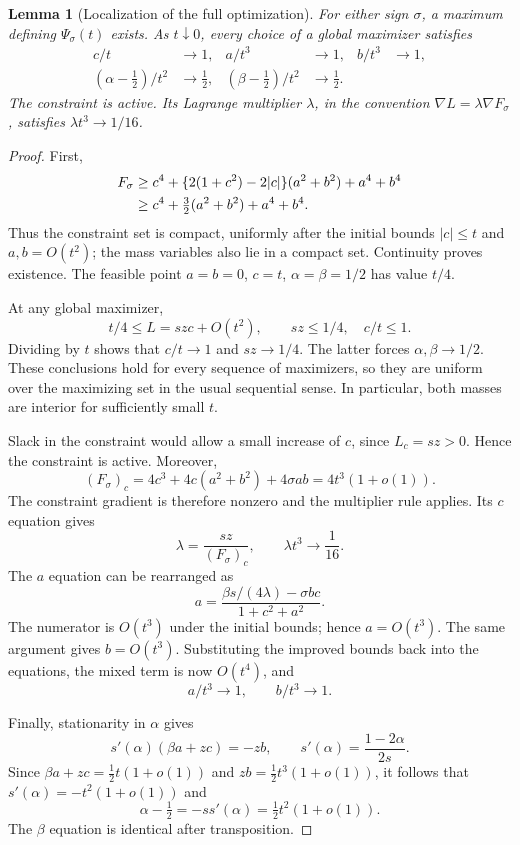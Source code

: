 \documentclass[11pt]{article}
\newtheorem{lemma}[theorem]{Lemma}
\theoremstyle{definition}
\newcommand{\1}{\mathbf 1}
\begin{document}
\begin{lemma}[Localization of the full optimization]\label{lem:localize}
For either sign $\sigma$, a maximum defining $\Psi_\sigma(t)$ exists. As $t\downarrow0$, every choice of a global maximizer satisfies
\begin{align}
 c/t&\longrightarrow1,& a/t^3&\longrightarrow1,& b/t^3&\longrightarrow1,\label{eq:loc1}\\
 (\alpha-\tfrac12)/t^2&\longrightarrow\tfrac12,&
 (\beta-\tfrac12)/t^2&\longrightarrow\tfrac12.\label{eq:loc2}
\end{align}
The constraint is active. Its Lagrange multiplier $\lambda$, in the convention $\nabla L=\lambda\nabla F_\sigma$, satisfies $\lambda t^3\to1/16$.
\end{lemma}
\begin{proof}
First,
\begin{align}
F_\sigma
&\ge c^4+\{2(1+c^2)-2|c|\}(a^2+b^2)+a^4+b^4\notag\\
&\ge c^4+\tfrac32(a^2+b^2)+a^4+b^4.\label{eq:coercive}
\end{align}
Thus the constraint set is compact, uniformly after the initial bounds $|c|\le t$ and $a,b=O(t^2)$; the mass variables also lie in a compact set. Continuity proves existence. The feasible point $a=b=0$, $c=t$, $\alpha=\beta=1/2$ has value $t/4$.

At any global maximizer,
\[
 t/4\le L=szc+O(t^2),\qquad sz\le1/4,\quad c/t\le1.
\]
Dividing by $t$ shows that $c/t\to1$ and $sz\to1/4$. The latter forces $\alpha,\beta\to1/2$. These conclusions hold for every sequence of maximizers, so they are uniform over the maximizing set in the usual sequential sense. In particular, both masses are interior for sufficiently small $t$.

Slack in the constraint would allow a small increase of $c$, since $L_c=sz>0$. Hence the constraint is active. Moreover,
\[
 (F_\sigma)_c=4c^3+4c(a^2+b^2)+4\sigma ab=4t^3(1+o(1)).
\]
The constraint gradient is therefore nonzero and the multiplier rule applies. Its $c$ equation gives
\[
 \lambda=\frac{sz}{(F_\sigma)_c},\qquad \lambda t^3\longrightarrow\frac1{16}.
\]
The $a$ equation can be rearranged as
\[
 a=\frac{\beta s/(4\lambda)-\sigma bc}{1+c^2+a^2}.
\]
The numerator is $O(t^3)$ under the initial bounds; hence $a=O(t^3)$. The same argument gives $b=O(t^3)$. Substituting the improved bounds back into the equations, the mixed term is now $O(t^4)$, and
\[
 a/t^3\longrightarrow1,\qquad b/t^3\longrightarrow1.
\]

Finally, stationarity in $\alpha$ gives
\[
 s'(\alpha)(\beta a+zc)=-zb,
 \qquad s'(\alpha)=\frac{1-2\alpha}{2s}.
\]
Since $\beta a+zc=\tfrac12t(1+o(1))$ and $zb=\tfrac12t^3(1+o(1))$, it follows that $s'(\alpha)=-t^2(1+o(1))$ and
\[
 \alpha-\tfrac12=-s s'(\alpha)=\tfrac12t^2(1+o(1)).
\]
The $\beta$ equation is identical after transposition.
\end{proof}
\end{document}
